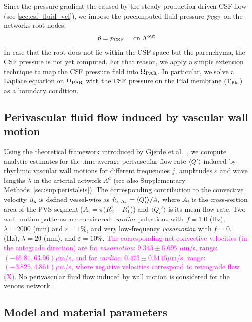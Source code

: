 \documentclass[fleqn,10pt]{wlscirep}
\newcommand{\mer}[1]{\textcolor{magenta}{#1}}
\begin{document}
Since the pressure gradient the caused by the steady production-driven CSF flow (see \cref{sec:csf_fluid_vel}), we impose the precomputed fluid pressure $p_{\rm CSF}$ on the networks root nodes:
\begin{equation}
    \hat{p} = p_{\rm CSF} \quad \text{ on } \Lambda^{\rm out}
\end{equation}
In case that the root does not lie within the CSF-space but the parenchyma, the CSF pressure is not yet computed. For that reason, we apply a simple extension technique to map the CSF pressure field into $\Omega_{\rm PAR}$. In particular, we solve a Laplace equation on $\Omega_{\rm PAR}$ with the CSF pressure on the Pial membrane ($\Gamma_{\rm Pia}$) as a boundary condition.


\subsection*{Perivascular fluid flow induced by vascular wall motion}

Using the theoretical framework introduced by Gjerde et
al.~\cite{gjerde2023directional}, we compute analytic estimates for
the time-average perivascular flow rate $\langle Q' \rangle$ induced
by rhythmic vascular wall motions for different frequencies $f$,
amplitudes $\varepsilon$ and wave lengths $\lambda$ in the arterial
network $\Lambda^a$ (see also Supplementary
Methods~\ref{sec:sup:peristalsis}). The corresponding contribution to
the convective velocity $\hat{u}_{\rm x}$ is defined vessel-wise as
$\hat{u}_{\rm x}|_{\Lambda_i} = \langle Q'_i \rangle/A_i$ where $A_i$
is the cross-section area of the PVS segment ($A_i = \pi (R_2^i -
R_1^i$)) and $\langle Q_i' \rangle$ is its mean flow rate. Two wall
motion patterns are considered: \emph{cardiac} pulsations with $f =
1.0$ (Hz), $\lambda = 2000$ (mm) and $\varepsilon = 1\%$, and very
low-frequency \emph{vasomotion} with $f = 0.1$ (Hz), $\lambda = 20$
(mm), and $\varepsilon = 10\%$. \mer{The corresponding net convective
velocities (in the antegrade direction) are for \emph{vasomotion}:
$9.345 \pm 6.695$ $\mu$m/s, range: $(-65.81, 63.96) \mu$m/s, and for
\emph{cardiac}: $0.475 \pm 0.5115 \mu$m/s, range: $(- 3.825, 4.861)
\mu$m/s, where negative velocities correspond to retrograde flow
(\Cref{fig:pvs}\mer{X}).} No perivascular fluid flow induced by wall
motion is considered for the venous network.


\subsection*{Model and material parameters}
\end{document}
